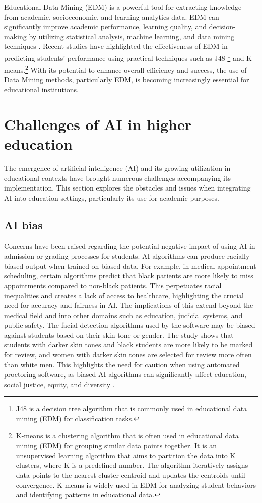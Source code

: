 Educational Data Mining (EDM) is a powerful tool for extracting knowledge from academic, socioeconomic,
and learning analytics data. EDM can significantly improve academic performance, learning quality,
and decision-making by utilizing statistical analysis, machine learning, and data mining techniques \citep{hooda_integrating_2022, arifin_using_2022}.
Recent studies have highlighted the effectiveness of EDM in predicting students' performance using
practical techniques such as J48 \footnote{J48 is a decision tree algorithm that is commonly used in
	educational data mining (EDM) for classification tasks.} and K-means.\footnote{ K-means is a clustering algorithm that is often used in educational data mining
	(EDM) for grouping similar data points together. It is an unsupervised learning algorithm that aims to partition the data into K clusters, where K is a predefined number.
	The algorithm iteratively assigns data points to the nearest cluster centroid and updates the centroids until convergence.
	K-means is widely used in EDM for analyzing student behaviors and identifying patterns in educational data.}
With its potential to enhance overall efficiency and success\citep{prince_sattam_bin_abdulaziz_university_state_2016},
the use of Data Mining methods, particularly EDM, is becoming increasingly essential for educational institutions.


\section{Challenges of AI in higher education}
The emergence of artificial intelligence (AI) and its growing utilization in educational
contexts have brought numerous challenges accompanying its implementation.  This section explores the obstacles
and issues when integrating AI into education settings, particularly its use for academic purposes.
\subsection{AI bias}
Concerns have been raised regarding the potential negative impact of using AI in admission or
grading processes for students. AI algorithms can produce racially biased output when trained on biased data.
For example, in medical appointment scheduling, certain algorithms predict that black patients are more likely
to miss appointments compared to non-black patients. This perpetuates racial inequalities and creates a lack of
access to healthcare, highlighting the crucial need for accuracy and fairness in AI. The implications of this
extend beyond the medical field and into other domains such as education, judicial systems, and public safety\citep{shanklin_ethical_2022}.
The facial detection algorithms used by the software may be biased against students based on their skin tone or gender.
The study shows that students with darker skin tones and black students are more likely to be marked for review, and women
with darker skin tones are selected for review more often than white men. This highlights the need for caution when using
automated proctoring software, as biased AI algorithms can significantly affect education, social justice, equity, and diversity
\citep{yoder-himes_racial_2022}.

